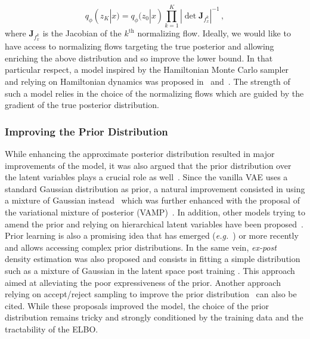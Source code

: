 \documentclass[10pt,journal,compsoc]{IEEEtran}
\begin{document}
\[
q_{\phi}(z_K|x) = q_{\phi}(z_0|x) \prod \limits _{k=1}^K |\det \mathbf{J}_{f_x^k}|^{-1}\,,
\]
where $\mathbf{J}_{f_x^k}$ is the Jacobian of the $k^{\mathrm{th}}$ normalizing flow. Ideally, we would like to have access to normalizing flows targeting the true posterior and allowing enriching the above distribution and so improve the lower bound. In that particular respect, a model inspired by the Hamiltonian Monte Carlo sampler~\cite{neal_mcmc_2011} and relying on Hamiltonian dynamics was proposed in~\cite{salimans_markov_2015} and~\cite{caterini_hamiltonian_2018}. The strength of such a model relies in the choice of the normalizing flows which are guided by the gradient of the true posterior distribution. 
 
\subsubsection{Improving the Prior Distribution}
While enhancing the approximate posterior distribution resulted in major improvements of the model, it was also argued that the prior distribution over the latent variables plays a crucial role as well~\cite{hoffman_elbo_2016}. Since the vanilla VAE uses a standard Gaussian distribution as prior, a natural improvement consisted in using a mixture of Gaussian instead~\cite{nalisnick_approximate_2016,dilokthanakul_deep_2017} which was further enhanced with the proposal of the variational mixture of posterior (VAMP)~\cite{tomczak_vae_2018}. In addition, other models trying to amend the prior and relying on hierarchical latent variables have been proposed~\cite{sonderby_ladder_2016,burda_importance_2016,klushyn_learning_2019}. Prior learning is also a promising idea that has emerged (\emph{e.g.}~\cite{chen_variational_2016}) or more recently~\cite{razavi_generating_2019,pang_learning_2020,aneja_ncp-vae_2020} and allows accessing complex prior distributions. In the same vein, \emph{ex-post} density estimation was also proposed and consists in fitting a simple distribution such as a mixture of Gaussian in the latent space post training \cite{ghosh_variational_2020}. This approach aimed at alleviating the poor expressiveness of the prior. Another approach relying on accept/reject sampling to improve the prior distribution~\cite{bauer_resampled_2019} can also be cited. While these proposals improved the model, the choice of the prior distribution remains tricky and strongly conditioned by the training data and the tractability of the ELBO. 
\end{document}
